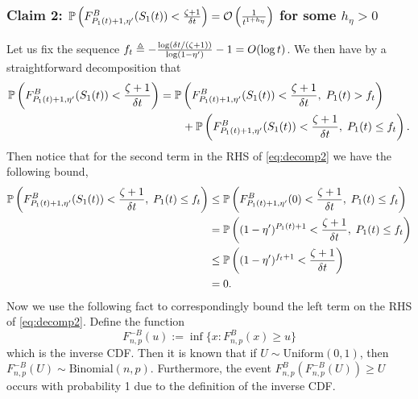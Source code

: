 \begin{myproof}[Proof.]
	\subsubsection*{Claim 2: $\mathbb{P}\left(F^B_{P_{1}(t)+1, \eta'}(S_1(t)) < \frac{\zeta + 1}{\delta t}\right) = \mathcal{O}\left(\frac{1}{t^{1 + h_\eta}}\right)$ for some $h_\eta > 0$}
	Let us fix the sequence $f_t \triangleq -\frac{\log (\delta t/(\zeta+1)) }{\log (1-\eta')}-1 = O(\log t)$. We then have by a straightforward decomposition that
	\begin{align}
	\mathbb{P} \left( F^B_{P_{1}(t)+1, \eta'}(S_1(t)) < \frac{\zeta + 1}{\delta t} \right) & = \mathbb{P} \left( F^B_{P_{1}(t)+1, \eta'}(S_1(t)) < \frac{\zeta + 1}{\delta t}, \; P_{1}(t) > f_t \right)  \nonumber \\
	& \qquad + \mathbb{P} \left( F^B_{P_{1}(t)+1, \eta'}(S_1(t)) < \frac{\zeta + 1}{\delta t}, \; P_{1}(t) \le f_t \right) \label{eq:decomp2}.
	\end{align}
	Then notice that for the second term in the RHS of \eqref{eq:decomp2} we have the following bound,
	\begin{align}
	\mathbb{P} \left( F^B_{P_{1}(t)+1, \eta'}(S_1(t)) < \frac{\zeta + 1}{\delta t}, \; P_{1}(t) \le f_t \right)  &  \le \mathbb{P} \left( F^B_{P_{1}(t)+1,\eta'}(0) < \frac{\zeta + 1}{\delta  t}, \; P_{1}(t) \le f_t \right) \nonumber \\
	& = \mathbb{P} \left( (1-\eta')^{P_{1}(t)+1} <  \frac{\zeta + 1}{\delta  t}, \; P_{1}(t) \le f_t \right) \nonumber \\
	& \le \mathbb{P} \left( (1-\eta')^{f_t+1} <  \frac{\zeta + 1}{\delta  t} \right) \nonumber \\
	& = 0. \label{bound:bdd_by_zero}
	\end{align}
	Now we use the following fact to correspondingly bound the left term on the RHS of \eqref{eq:decomp2}. Define the function
	\[
	F^{-B}_{n,p}(u) := \inf\{x : F^B_{n,p}(x) \ge u\}
	\]
	which is the inverse CDF. Then it is known that if $U \sim \text{Uniform}(0,1)$, then $F^{-B}_{n,p}(U) \sim \text{Binomial}(n,p)$. Furthermore, the event $F^B_{n,p}(F^{-B}_{n,p}(U)) \ge U$ occurs with probability 1 due to the definition of the inverse CDF.
	

\end{myproof}
